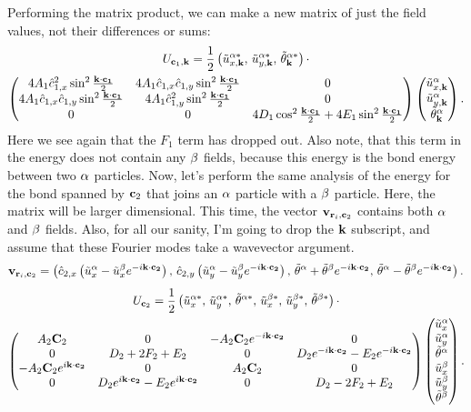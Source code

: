 \documentclass[12pt]{article}
\begin{document}
Performing the matrix product, we can make a new matrix of just the field 
values, not their differences or sums:
\begin{multline*} U_{\mathbf{c}_1,\mathbf{k}} = \frac{1}{2} \left(\tilde u^{\alpha *}_{x,\mathbf{k}}, \, \tilde u^{\alpha *}_{y,\mathbf{k}},\, \tilde {\theta}^{\alpha *}_{\mathbf{k}}\right) \cdot \\ \left(\begin{matrix} 
4A_1 \hat c_{1,x}^2 \sin^2\frac{\mathbf{k}\cdot\mathbf{c_1}}{2} & 4A_1 \hat 
c_{1,x} \hat c_{1,y} \sin^2\frac{\mathbf{k}\cdot\mathbf{c_1}}{2} & 0 \\ 4A_1 \hat 
c_{1,x} \hat c_{1,y} \sin^2\frac{\mathbf{k}\cdot\mathbf{c_1}}{2} & 4A_1 \hat 
c_{1,y}^2 \sin^2\frac{\mathbf{k}\cdot\mathbf{c_1}}{2} & 0 \\ 0 & 0 & 4D_1\cos^2 
\frac{\mathbf{k}\cdot\mathbf{c_1}}{2} + 4E_1 \sin^2 \frac{\mathbf{k}\cdot\mathbf{c_1}}{2} \end{matrix}\right) \left(\begin{matrix} \tilde 
u^\alpha_{x,\mathbf{k}} \\ \tilde u^\alpha_{y,\mathbf{k}} \\ \tilde {\theta}^\alpha_{\mathbf{k}} 
\end{matrix}\right).\end{multline*}
Here we see again that the $F_1$ term has dropped out. Also note, that this 
term in the energy does not contain any $\beta$ fields, because this energy is 
the bond energy between two $\alpha$ particles. Now, let's perform the same 
analysis of the energy for the bond spanned by $\mathbf{c}_2$ that joins an $\alpha$ 
particle with a $\beta$ particle. Here, the matrix will be larger dimensional. 
This time, the vector $\mathbf{v}_{\mathbf{r}_i,\mathbf{c}_2}$ contains both $\alpha$ and $\beta$ 
fields. Also, for all our sanity, I'm going to drop the $\mathbf{k}$ subscript, and 
assume that these Fourier modes take a wavevector argument.
\[ \mathbf{v}_{\mathbf{r}_i, \mathbf{c}_2} = \left( \hat c_{2,x}\left(\tilde u_x^\alpha- 
\tilde u_x^\beta e^{-i\mathbf{k}\cdot\mathbf{c_2}}\right), \, \hat c_{2,y}\left(\tilde 
u_y^\alpha-\tilde u_y^\beta e^{-i\mathbf{k}\cdot\mathbf{c_2}}\right), \, \tilde {\theta}^\alpha +
\tilde {\theta}^\beta e^{-i\mathbf{k}\cdot\mathbf{c_2}}, \, \tilde {\theta}^\alpha -\tilde 
{\theta}^\beta e^{-i\mathbf{k}\cdot\mathbf{c_2} } \right).\]
\begin{multline*} U_{\mathbf{c}_2} = \frac{1}{2} \left(\tilde u_x^{\alpha *} 
, \, \tilde 
u_y^{\alpha *} , \, \tilde {\theta}^{\alpha *} , \, \tilde u_x^{\beta *} , \, \tilde u_y^{\beta *}, 
\, \tilde {\theta}^{\beta *} \right) \cdot \\  \left(\begin{matrix}
 A_2\mathbf{C}_2 & 0 & -A_2 \mathbf{C}_2 e^{-i\mathbf{k}\cdot\mathbf{c_2}} & 0 \\
0 & D_2 + 2F_2 + E_2 & 0 & D_2e^{-i\mathbf{k}\cdot\mathbf{c_2}} - 
E_2e^{-i\mathbf{k}\cdot\mathbf{c_2}} \\
-A_2 \mathbf{C}_2 e^{i\mathbf{k}\cdot\mathbf{c_2}} & 0 & A_2 \mathbf{C}_2 & 0  \\
0 &  D_2 e^{i\mathbf{k}\cdot\mathbf{c_2}} - E_2 e^{i\mathbf{k}\cdot\mathbf{c_2}} & 0  & D_2 - 2F_2 + 
E_2\end{matrix}\right)
\left(\begin{matrix}\tilde u_x^{\alpha} \\ \tilde 
u_y^{\alpha} \\ \tilde {\theta}^{\alpha} \\ \tilde u_x^{\beta} \\ \tilde u_y^{\beta} \\  \tilde 
{\theta}^{\beta} \end{matrix}\right).\end{multline*}
\end{document}
